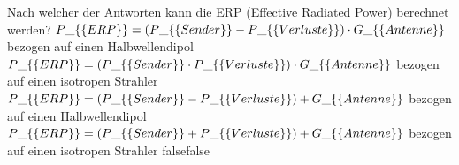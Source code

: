     {Nach welcher der Antworten kann die ERP (Effective Radiated Power) berechnet werden?}
    {$P\_\{\textrm\{ERP\}\} = (P\_\{\textrm\{Sender\}\} - P\_\{\textrm\{Verluste\}\}) \cdot G\_\{\textrm\{Antenne\}\}$ bezogen auf einen Halbwellendipol}
    {$P\_\{\textrm\{ERP\}\} = (P\_\{\textrm\{Sender\}\} \cdot P\_\{\textrm\{Verluste\}\}) \cdot G\_\{\textrm\{Antenne\}\}$ bezogen auf einen isotropen Strahler}
    {$P\_\{\textrm\{ERP\}\} = (P\_\{\textrm\{Sender\}\} - P\_\{\textrm\{Verluste\}\}) + G\_\{\textrm\{Antenne\}\}$ bezogen auf einen Halbwellendipol}
    {$P\_\{\textrm\{ERP\}\} = (P\_\{\textrm\{Sender\}\} + P\_\{\textrm\{Verluste\}\}) + G\_\{\textrm\{Antenne\}\}$ bezogen auf einen isotropen Strahler}
    {false}{false}